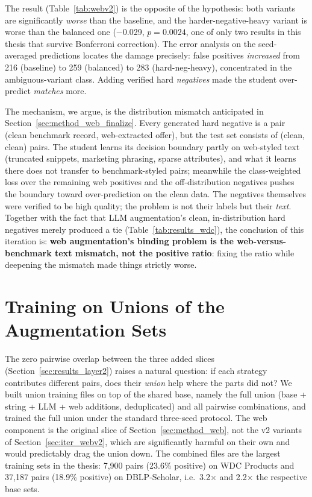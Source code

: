 \documentclass[a4paper,oneside,bibliography=totoc]{scrbook}
\begin{document}
The result (Table~\ref{tab:webv2}) is the opposite of the hypothesis: both variants are significantly \emph{worse} than the baseline, and the harder-negative-heavy variant is worse than the balanced one ($-$0.029, $p = 0.0024$, one of only two results in this thesis that survive Bonferroni correction). The error analysis on the seed-averaged predictions locates the damage precisely: false positives \emph{increased} from 216 (baseline) to 259 (balanced) to 283 (hard-neg-heavy), concentrated in the ambiguous-variant class. Adding verified hard \emph{negatives} made the student over-predict \emph{matches} more.

The mechanism, we argue, is the distribution mismatch anticipated in Section~\ref{sec:method_web_finalize}. Every generated hard negative is a pair (clean benchmark record, web-extracted offer), but the test set consists of (clean, clean) pairs. The student learns its decision boundary partly on web-styled text (truncated snippets, marketing phrasing, sparse attributes), and what it learns there does not transfer to benchmark-styled pairs; meanwhile the class-weighted loss over the remaining web positives and the off-distribution negatives pushes the boundary toward over-prediction on the clean data. The negatives themselves were verified to be high quality; the problem is not their labels but their \emph{text}. Together with the fact that LLM augmentation's clean, in-distribution hard negatives merely produced a tie (Table~\ref{tab:results_wdc}), the conclusion of this iteration is: \textbf{web augmentation's binding problem is the web-versus-benchmark text mismatch, not the positive ratio}: fixing the ratio while deepening the mismatch made things strictly worse.

\section{Training on Unions of the Augmentation Sets}
\label{sec:iter_union}

The zero pairwise overlap between the three added slices (Section~\ref{sec:results_layer2}) raises a natural question: if each strategy contributes different pairs, does their \emph{union} help where the parts did not? We built union training files on top of the shared base, namely the full union (base + string + LLM + web additions, deduplicated) and all pairwise combinations, and trained the full union under the standard three-seed protocol. The web component is the original slice of Section~\ref{sec:method_web}, not the v2 variants of Section~\ref{sec:iter_webv2}, which are significantly harmful on their own and would predictably drag the union down. The combined files are the largest training sets in the thesis: 7{,}900 pairs (23.6\% positive) on WDC Products and 37{,}187 pairs (18.9\% positive) on DBLP-Scholar, i.e.\ 3.2$\times$ and 2.2$\times$ the respective base sets.
\end{document}
